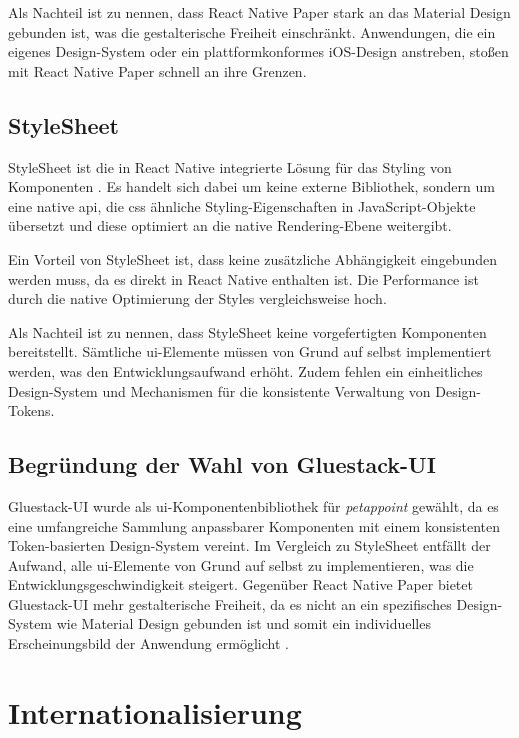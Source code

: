Als Nachteil ist zu nennen, dass React Native Paper stark an das 
Material Design gebunden ist, was die gestalterische Freiheit 
einschränkt. Anwendungen, die ein eigenes Design-System oder ein 
plattformkonformes iOS-Design anstreben, stoßen mit React Native 
Paper schnell an ihre Grenzen.

\subsection{StyleSheet}

StyleSheet ist die in React Native integrierte Lösung für das Styling 
von Komponenten \cite{react-native-docs}. Es handelt sich dabei um 
keine externe Bibliothek, sondern um eine native \gls{api}, die \gls{css} ähnliche
Styling-Eigenschaften in JavaScript-Objekte übersetzt und diese 
optimiert an die native Rendering-Ebene weitergibt.

Ein Vorteil von StyleSheet ist, dass keine zusätzliche Abhängigkeit 
eingebunden werden muss, da es direkt in React Native enthalten ist. 
Die Performance ist durch die native Optimierung der Styles 
vergleichsweise hoch.

Als Nachteil ist zu nennen, dass StyleSheet keine vorgefertigten 
Komponenten bereitstellt. Sämtliche \gls{ui}-Elemente müssen von Grund 
auf selbst implementiert werden, was den Entwicklungsaufwand 
erhöht. Zudem fehlen ein einheitliches Design-System 
und Mechanismen für die konsistente Verwaltung von Design-Tokens.

\subsection{Begründung der Wahl von Gluestack-UI}

Gluestack-UI wurde als \gls{ui}-Komponentenbibliothek für \textit{petappoint} gewählt, 
da es eine umfangreiche Sammlung anpassbarer Komponenten mit einem 
konsistenten Token-basierten Design-System vereint. Im Vergleich zu 
StyleSheet entfällt der Aufwand, alle \gls{ui}-Elemente von Grund auf selbst 
zu implementieren, was die Entwicklungsgeschwindigkeit 
steigert. Gegenüber React Native Paper bietet Gluestack-UI mehr 
gestalterische Freiheit, da es nicht an ein spezifisches Design-System 
wie Material Design gebunden ist und somit ein individuelles 
Erscheinungsbild der Anwendung ermöglicht \cite{gluestack-docs}.

\section{Internationalisierung}

